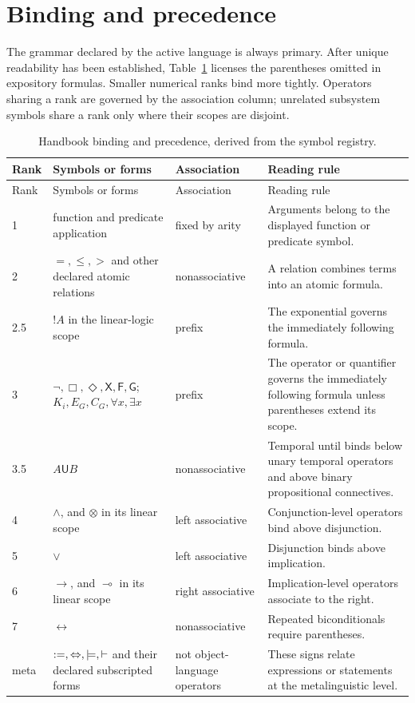 \section{Binding and precedence}
\label{sec:p01-binding-precedence}

The grammar declared by the active language is always primary.  After unique
readability has been established, Table~\ref{tab:p01-precedence} licenses the
parentheses omitted in expository formulas.  Smaller numerical ranks bind
more tightly.  Operators sharing a rank are governed by the association
column; unrelated subsystem symbols share a rank only where their scopes are
disjoint.

\begingroup\small
\begin{longtable}{@{}p{}p{}p{}p{}@{}}
\caption{Handbook binding and precedence, derived from the symbol registry.}
\label{tab:p01-precedence}\\
\toprule
Rank & Symbols or forms & Association & Reading rule \\
\midrule
\endfirsthead
\toprule
Rank & Symbols or forms & Association & Reading rule \\
\midrule
\endhead
1 & function and predicate application & fixed by arity & Arguments belong to
the displayed function or predicate symbol. \\
2 & \(=,\leq,>\) and other declared atomic relations & nonassociative & A
relation combines terms into an atomic formula. \\
2.5 & \(!A\) in the linear-logic scope & prefix & The exponential governs
the immediately following formula. \\
3 & \(\neg,\Box,\Diamond,\mathsf X,\mathsf F,\mathsf G\);
\(K_i,E_G,C_G,\forall x,\exists x\) & prefix & The operator or quantifier governs the
immediately following formula unless parentheses extend its scope. \\
3.5 & \(A\mathbin{\mathsf U}B\) & nonassociative & Temporal until binds
below unary temporal operators and above binary propositional connectives. \\
4 & \(\land\), and \(\otimes\) in its linear scope & left associative &
Conjunction-level operators bind above disjunction. \\
5 & \(\lor\) & left associative & Disjunction binds above implication. \\
6 & \(\to\), and \(\multimap\) in its linear scope & right associative &
Implication-level operators associate to the right. \\
7 & \(\leftrightarrow\) & nonassociative & Repeated biconditionals require
parentheses. \\
meta & \(\mathrel{:=},\Leftrightarrow,\models,\vdash\) and their declared
subscripted forms & not object-language operators & These signs relate
expressions or statements at the metalinguistic level. \\
\bottomrule
\end{longtable}
\endgroup

